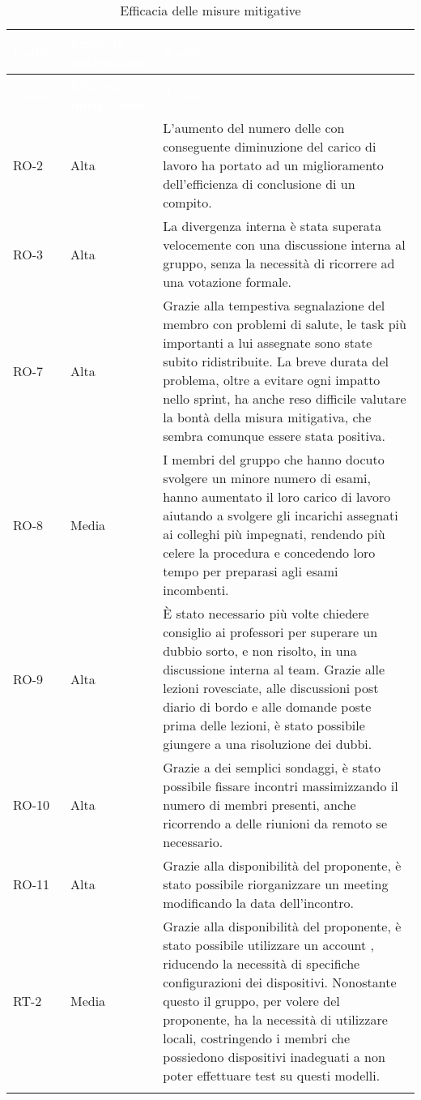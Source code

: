 {
\setlength{\tabcolsep}{10pt}
\renewcommand{\arraystretch}{1.5}
\begin{xltabular}{\textwidth}{| l | l | X |}
    \hline
     \textbf{\textcolor{white}{Codice}} & \textbf{\textcolor{white}{Efficacia mitigazione}} & \textbf{\textcolor{white}{Analisi}} \\
    \hline
    \endfirsthead
    \hline
     \textbf{\textcolor{white}{Codice}} & \textbf{\textcolor{white}{Efficacia mitigazione}} & \textbf{\textcolor{white}{Analisi}} \\
    \hline
    \endhead
    RO-2 & Alta & L'aumento del numero delle  con conseguente diminuzione del carico di lavoro ha portato ad un miglioramento dell'efficienza di conclusione di un compito. \\
    \hline
    RO-3 & Alta & La divergenza interna è stata superata velocemente con una discussione interna al gruppo, senza la necessità di ricorrere ad una votazione formale. \\
    \hline
    RO-7 & Alta & Grazie alla tempestiva segnalazione del membro con problemi di salute, le task più importanti a lui assegnate sono state subito ridistribuite. La breve durata del problema, oltre a evitare ogni impatto nello sprint, ha anche reso difficile valutare la bontà della misura mitigativa, che sembra comunque essere stata positiva.\\
    \hline
    RO-8 & Media & I membri del gruppo che hanno docuto svolgere un minore numero di esami, hanno aumentato il loro carico di lavoro aiutando a svolgere gli incarichi assegnati ai colleghi più impegnati, rendendo più celere la procedura e concedendo loro tempo per preparasi agli esami incombenti.\\
    \hline
    RO-9 & Alta & È stato necessario più volte chiedere consiglio ai professori per superare un dubbio sorto, e non risolto, in una discussione interna al team. Grazie alle lezioni rovesciate, alle discussioni post diario di bordo e alle domande poste prima delle lezioni, è stato possibile giungere a una risoluzione dei dubbi. \\
    \hline
    RO-10 & Alta & Grazie a dei semplici sondaggi, è stato possibile fissare incontri massimizzando il numero di membri presenti, anche ricorrendo a delle riunioni da remoto se necessario. \\
    \hline
    RO-11 & Alta & Grazie alla disponibilità del proponente, è stato possibile riorganizzare un meeting modificando la data dell'incontro. \\
    \hline
    RT-2 & Media & Grazie alla disponibilità del proponente, è stato possibile utilizzare un account , riducendo la necessità di specifiche configurazioni dei dispositivi. Nonostante questo il gruppo, per volere del proponente, ha la necessità di utilizzare  locali, costringendo i membri che possiedono dispositivi inadeguati a non poter effettuare test su questi modelli.\\
    \hline
     \caption{Efficacia delle misure mitigative}
    \label{tab:mitigazioni}
\end{xltabular}
}


\newpage
